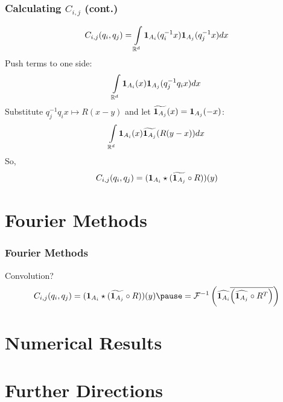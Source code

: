 \documentclass{beamer}
\begin{document}
\begin{frame}
\frametitle{Calculating $C_{i,j}$ (cont.)}
\[ C_{i,j}(q_i, q_j) = \int \limits_{\mathbb{R}^d} {\bf 1}_{A_i}(q_i^{-1} x) {\bf 1}_{A_j}(q_j^{-1} x) dx \]
\pause
Push terms to one side:
\[ \int \limits_{\mathbb{R}^d} {\bf 1}_{A_i}(x) {\bf 1}_{A_j}(q_j^{-1} q_i x) dx \]
\pause
Substitute $q_j^{-1} q_i x \mapsto R(x - y)$ and let $\widetilde{{\bf 1}_{A_j}}(x) = {\bf 1}_{A_j}(-x)$:
\[ \int \limits_{\mathbb{R}^d} {\bf 1}_{A_i}(x) \widetilde{{\bf 1}_{A_j}}(R(y - x)) dx \]
\pause
So,
\[ C_{i,j}(q_i, q_j) = ({\bf 1}_{A_i} \star (\widetilde{{\bf 1}_{A_j}} \circ R))(y) \]
\end{frame}

\section{Fourier Methods}
\begin{frame}
\frametitle{Fourier Methods}
Convolution? 
\[ C_{i,j}(q_i, q_j) = (\ind{A_i} \star (\widetilde{\ind{A_j}} \circ R))(y)
\pause
= \mathcal{F}^{-1} \left ( \widehat{\ind{A_i}} \overline{\left(\widehat{\ind{A_j}} \circ R^T \right)} \right ) \]

\end{frame}

\section{Numerical Results}

\section{Further Directions}

\end{document}
